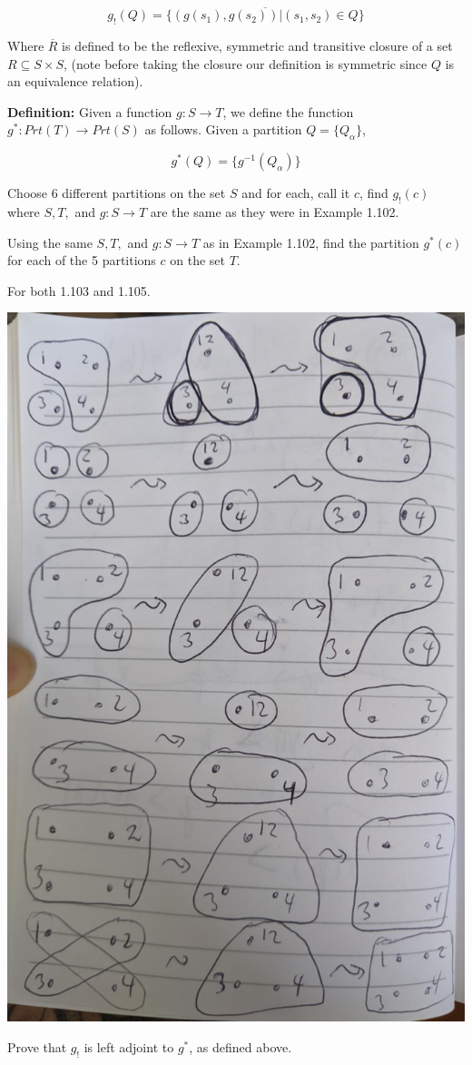 $$g_!(Q) = \overline{\{(g(s_1),g(s_2))| (s_1,s_2)\in Q\}}$$

\noindent
Where $\overline{R}$ is defined to be the reflexive, symmetric and transitive closure of a set $R\subseteq S\times S$, (note before taking the closure our definition is symmetric since $Q$ is an equivalence relation).  

\bigskip\noindent\textbf{Definition:} Given a function $g:S \to T$, we define the function $g^*:Prt(T) \to Prt(S)$ as follows. Given a partition $Q = \{Q_\alpha \}$, 

$$g^*(Q) = \{g^{-1}(Q_\alpha) \}$$

Choose 6 different partitions on the set $S$ and for each, call it $c$, find $g_!(c)$ where $S, T,$ and $g:S\to T$ are the same as they were in Example 1.102.

Using the same $S, T,$ and $g:S\to T$ as in Example 1.102, find the partition $g^*(c)$ for each of the 5 partitions $c$ on the set $T$.

\solution
For both 1.103 and 1.105.

\includegraphics[width=0.5\linewidth]{images/1-105.jpg}

Prove that $g_!$ is left adjoint to $g^*$, as defined above.

